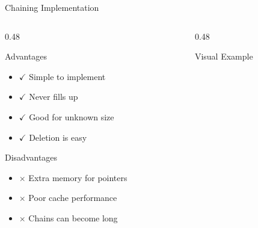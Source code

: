 \documentclass[aspectratio=169,xcolor=dvipsnames]{beamer}
\begin{document}
\begin{frame}{Chaining Implementation}
  \begin{columns}
    \begin{column}{0.48\textwidth}
      \begin{block}{Advantages}
        \begin{itemize}
          \item $\checkmark$ Simple to implement
          \item $\checkmark$ Never fills up
          \item $\checkmark$ Good for unknown size
          \item $\checkmark$ Deletion is easy
        \end{itemize}
      \end{block}

      \begin{block}{Disadvantages}
        \begin{itemize}
          \item $\times$ Extra memory for pointers
          \item $\times$ Poor cache performance
          \item $\times$ Chains can become long
        \end{itemize}
      \end{block}
    \end{column}
    \begin{column}{0.48\textwidth}
      \begin{exampleblock}{Visual Example}
      \end{exampleblock}
    \end{column}
  \end{columns}
\end{frame}
\end{document}
